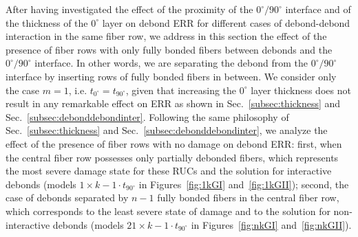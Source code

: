 \documentclass[Review,sagev,times]{sagej}
\begin{document}
After having investigated the effect of the proximity of the $0^{\circ}/90^{\circ}$ interface and of the thickness of the $0^{\circ}$ layer on debond ERR for different cases of debond-debond interaction in the same fiber row, we address in this section the effect of the presence of fiber rows with only fully bonded fibers between debonds and the $0^{\circ}/90^{\circ}$ interface. In other words, we are separating the debond from the $0^{\circ}/90^{\circ}$ interface by inserting rows of fully bonded fibers in between. We consider only the case $m=1$, i.e. $t_{0^{\circ}}=t_{90^{\circ}}$, given that increasing the $0^{\circ}$ layer thickness does not result in any remarkable effect on ERR as shown in Sec.~\ref{subsec:thickness} and Sec.~\ref{subsec:debonddebondinter}. Following the same philosophy of Sec.~\ref{subsec:thickness} and Sec.~\ref{subsec:debonddebondinter}, we analyze the effect of the presence of fiber rows with no damage on debond ERR: first, when the central fiber row possesses only partially debonded fibers, which represents the most severe damage state for these RUCs and the solution for interactive debonds (models $1\times k-1\cdot t_{90^{\circ}}$ in Figures~\ref{fig:1kGI} and~\ref{fig:1kGII}); second, the case of debonds separated by $n-1$ fully bonded fibers in the central fiber row, which corresponds to the least severe state of damage and to the solution for non-interactive debonds (models $21\times k-1\cdot t_{90^{\circ}}$ in Figures~\ref{fig:nkGI} and~\ref{fig:nkGII}).\\%
\end{document}
